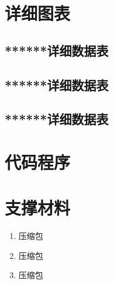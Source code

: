 \newpage
\appendix

\section{详细图表}
\subsection*{******详细数据表}%

\subsection*{******详细数据表}

\subsection*{******详细数据表}


\section{代码程序}






\section{支撑材料}

\begin{enumerate}
	\item 	压缩包
	
	\item 	压缩包
	
	\item 	压缩包
\end{enumerate}

